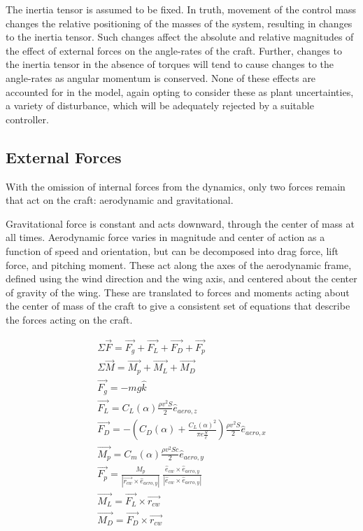 \documentclass{sydeStyle}
\begin{document}
The inertia tensor is assumed to be fixed. In truth, movement of the control
mass changes the relative positioning of the masses of the system, resulting in
changes to the inertia tensor. Such changes affect the absolute and relative
magnitudes of the effect of external forces on the angle-rates of the craft.
Further, changes to the inertia tensor in the absence of torques will tend to
cause changes to the angle-rates as angular momentum is conserved. None of these
effects are accounted for in the model, again opting to consider these as plant
uncertainties, a variety of disturbance, which will be adequately rejected by a suitable
controller.

\subsection{External Forces}

With the omission of internal forces from the dynamics, only two forces remain
that act on the craft: aerodynamic and gravitational.

Gravitational force is constant and acts downward, through the center of mass at
all times. Aerodynamic force varies in magnitude and center of action as a
function of speed and orientation, but can be decomposed into drag force, lift
force, and pitching moment. These act along the axes of the aerodynamic frame,
defined using the wind direction and the wing axis, and centered about the
center of gravity of the wing. These are translated to forces
and moments acting about the center of mass of the craft to give a consistent
set of equations that describe the forces acting on the craft.

\begin{eqnarray*}
\Sigma \vec{F} = \vec{F_g} + \vec{F_L} + \vec{F_D} + \vec{F_p} \\
\Sigma \vec{M} = \vec{M_p} + \vec{M_L} + \vec{M_D} \\
\vec{F_g} = -mg\hat{k} \\
\vec{F_L} = C_L(\alpha) \frac{\rho v^2 S}{2}\hat{e}_{aero,z} \\
\vec{F_D} = -(C_D(\alpha) + \frac{C_L(\alpha)^2}{\pi e \frac{S}{c}})\frac{\rho v^2 S}{2}\hat{e}_{aero,x} \\
\vec{M_p} = C_m(\alpha) \frac{\rho v^2 S c}{2} \hat{e}_{aero,y} \\
\vec{F_p} = \frac{M_p}{| \vec{r_{cw}} \times \hat{e}_{aero,y} |} \
    \frac{\hat{e}_{cw} \times \hat{e}_{aero,y}}{|\hat{e}_{cw} \times \hat{e}_{aero,y}|} \\
\vec{M_L} = \vec{F_L} \times \vec{r_{cw}} \\
\vec{M_D} = \vec{F_D} \times \vec{r_{cw}} \\
\end{eqnarray*}
\end{document}
